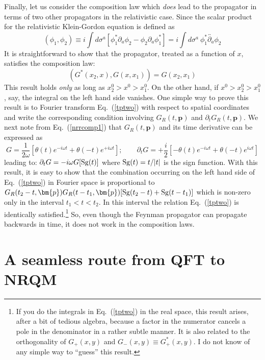 \documentclass{article}
\def\eq#1{{Eq.~(\ref{#1})}}
\begin{document}
Finally, let us consider the composition law which \textit{does} lead to the propagator in terms of two other propagators in the relativistic case. Since the scalar product for the relativistic Klein-Gordon equation is defined as 
\begin{equation}
(\phi_1,\phi_2)\equiv i\int d\sigma^a [\phi_1^*\partial_a\phi_2-\phi_2\partial_a\phi_1^*] = i \int d\sigma^a \ \phi_1^*\overleftrightarrow{\partial_a}\phi_2
\end{equation} 
It is straightforward to show that the propagator, treated as a function of $x$, satisfies the composition law:
\begin{equation}
 (G^*(x_2,x),G(x,x_1))=G(x_2,x_1)
 \label{tptwo}
\end{equation}
This result holds \textit{only} as long as $x_2^0>x^0>x_1^0$. On the other hand, if $x^0>x_2^0 >x_1^0$, say,  the integral on the left hand side vanishes. One simple way to prove this result is to 
Fourier transform \eq{tptwo} with respect to spatial coordinates and write the corresponding condition involving  $G_R(t,\bm{p}) $ and $\partial_t G_R(t,\bm{p}) $. We next note from \eq{nrrcomp1} that $G_R(t,\bm{p}) $ and its time derivative can be expressed as 
\begin{equation}
 G = \frac{1}{2\omega} \left[ \theta(t) e^{-i \omega t} + \theta(-t) e^{+i\omega t}\right]; \qquad 
 \partial_t G = + \frac{i}{2} \left[-\theta(t) e^{-i \omega t} + \theta(-t) e^{i\omega t}\right]
\end{equation} 
leading to:
$
 \partial_t G = - i \omega G[{\rm Sg}(t)]
$ where ${\rm Sg}(t)=t/|t|$ is the sign function. With this result, it is easy to show that the combination occurring on the left hand side of \eq{tptwo} in Fourier space  is proportional to
$G_R(t_2-t,\bm{p})G_R(t-t_1,\bm{p})[{\rm Sg}(t_2-t)+{\rm Sg}(t-t_1)]$
which is non-zero only in the interval 
 $t_1<t<t_2$.
  In this interval the relation \eq{tptwo} is identically satisfied.\footnote{If you do the integrals in \eq{tptwo} in the real space, this result arises, after a bit of tedious algebra, because a factor in the numerator cancels a pole in the denominator in a rather subtle manner. 
 It is also related to the orthogonality of $G_+(x,y)$ and $G_-(x,y) \equiv G_+^*(x,y)$.
 I do not know of any simple way to ``guess'' this result.} So, even though the Feynman propagator can propagate backwards in time, it does not work in the composition laws.

\section{A seamless route  from QFT to NRQM}\label{sec:seamless}
\end{document}
